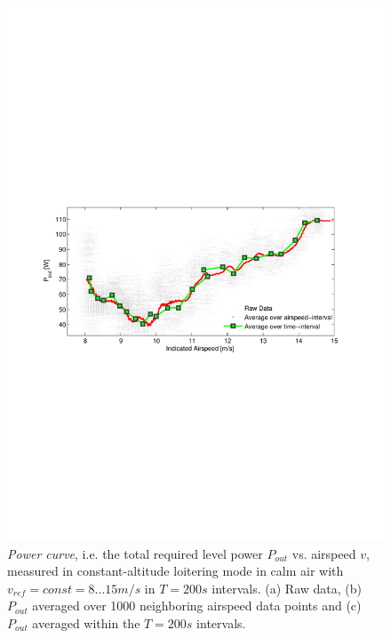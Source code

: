 \begin{figure}[tb]
    \centering
     \includegraphics[width=\linewidth]{images/PowerMeasurements/PowerMeasurements}
    \caption{\textit{Power curve}, i.e. the total required level power $P_{out}$ vs. airspeed $v$, measured in constant-altitude loitering mode in calm air with $v_{ref}=const=8...15m/s$ in $T=200s$ intervals. (a) Raw data, (b) $P_{out}$ averaged over 1000 neighboring airspeed data points and (c) $P_{out}$ averaged within the $T=200s$ intervals.} 
    \label{fig:PowerMeasurements}
\end{figure}

